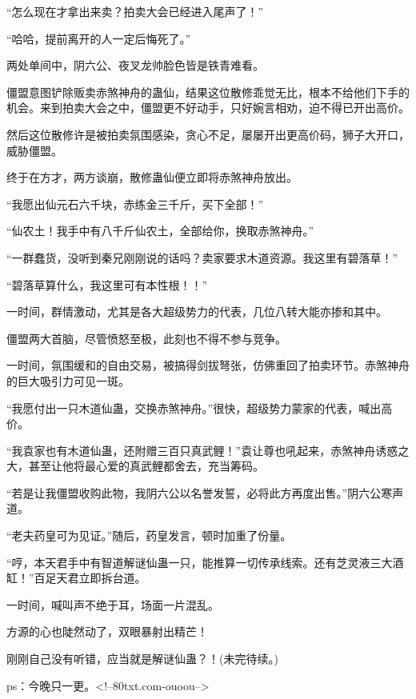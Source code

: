 \begin{this_body}
“怎么现在才拿出来卖？拍卖大会已经进入尾声了！”

“哈哈，提前离开的人一定后悔死了。”

两处单间中，阴六公、夜叉龙帅脸色皆是铁青难看。

僵盟意图铲除贩卖赤煞神舟的蛊仙，结果这位散修乖觉无比，根本不给他们下手的机会。来到拍卖大会之中，僵盟更不好动手，只好婉言相劝，迫不得已开出高价。

然后这位散修许是被拍卖氛围感染，贪心不足，屡屡开出更高价码，狮子大开口，威胁僵盟。

终于在方才，两方谈崩，散修蛊仙便立即将赤煞神舟放出。

“我愿出仙元石六千块，赤练金三千斤，买下全部！”

“仙农土！我手中有八千斤仙农土，全部给你，换取赤煞神舟。”

“一群蠢货，没听到秦兄刚刚说的话吗？卖家要求木道资源。我这里有碧落草！”

“碧落草算什么，我这里可有本性根！！”

一时间，群情激动，尤其是各大超级势力的代表，几位八转大能亦掺和其中。

僵盟两大首脑，尽管愤怒至极，此刻也不得不参与竞争。

一时间，氛围缓和的自由交易，被搞得剑拔弩张，仿佛重回了拍卖环节。赤煞神舟的巨大吸引力可见一斑。

“我愿付出一只木道仙蛊，交换赤煞神舟。”很快，超级势力蒙家的代表，喊出高价。

“我袁家也有木道仙蛊，还附赠三百只真武鲤！”袁让尊也吼起来，赤煞神舟诱惑之大，甚至让他将最心爱的真武鲤都舍去，充当筹码。

“若是让我僵盟收购此物，我阴六公以名誉发誓，必将此方再度出售。”阴六公寒声道。

“老夫药皇可为见证。”随后，药皇发言，顿时加重了份量。

“哼，本天君手中有智道解谜仙蛊一只，能推算一切传承线索。还有芝灵液三大酒缸！”百足天君立即拆台道。

一时间，喊叫声不绝于耳，场面一片混乱。

方源的心也陡然动了，双眼暴射出精芒！

刚刚自己没有听错，应当就是解谜仙蛊？！(未完待续。)

ps：今晚只一更。<!--80txt.com-ouoou-->

\end{this_body}

